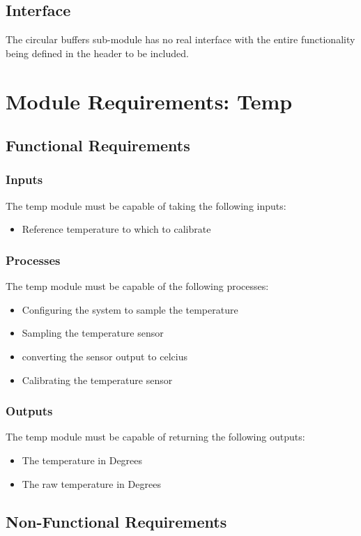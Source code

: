 \documentclass[]{report}
\begin{document}
\subsection{Interface}
The circular buffers sub-module has no real interface with the entire functionality being defined in the header to be included.

\section{Module Requirements: Temp}
\subsection{Functional Requirements}
\subsubsection{Inputs}
The temp module must be capable of taking the following inputs:
\begin{itemize}
	\item Reference temperature to which to calibrate
\end{itemize}

\subsubsection{Processes}
The temp module must be capable of the following processes:
\begin{itemize}
	\item Configuring the system to sample the temperature
	\item Sampling the temperature sensor
	\item converting the sensor output to celcius
	\item Calibrating the temperature sensor
\end{itemize}

\subsubsection{Outputs}
The temp module must be capable of returning the following outputs:
\begin{itemize}
	\item The temperature in Degrees
	\item The raw temperature in Degrees
\end{itemize}

\subsection{Non-Functional Requirements}
\end{document}
